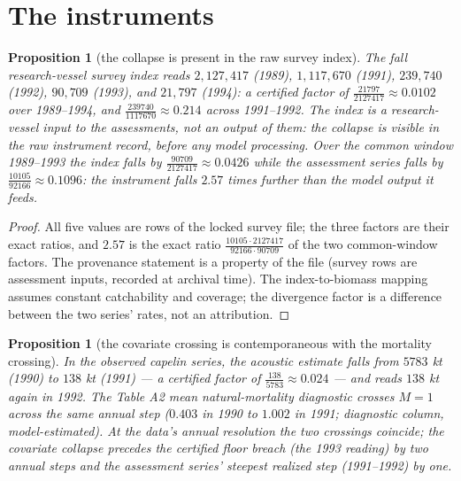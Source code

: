 \documentclass[10pt,twocolumn]{article}
\theoremstyle{plain}
\newtheorem{proposition}[theorem]{Proposition}
\theoremstyle{remark}
\begin{document}
\section{The instruments}\label{instruments}

\begin{proposition}[the collapse is present in the raw survey index]
\label{prop:survey}
The fall research-vessel survey index reads \(2{,}127{,}417\) (1989),
\(1{,}117{,}670\) (1991), \(239{,}740\) (1992), \(90{,}709\) (1993),
and \(21{,}797\) (1994): a certified factor of
\(\tfrac{21797}{2127417} \approx 0.0102\) over 1989--1994, and
\(\tfrac{239740}{1117670} \approx 0.214\) across 1991--1992. The index
is a research-vessel input to the assessments, not an output of them:
the collapse is visible in the raw instrument record, before any model
processing. Over the common window 1989--1993 the index falls by
\(\tfrac{90709}{2127417} \approx 0.0426\) while the assessment series
falls by \(\tfrac{10105}{92166} \approx 0.1096\): the instrument falls
\(2.57\) times further than the model output it feeds.
\end{proposition}

\begin{proof}
All five values are rows of the locked survey file; the three factors
are their exact ratios, and \(2.57\) is the exact ratio
\(\tfrac{10105 \cdot 2127417}{92166 \cdot 90709}\) of the two
common-window factors. The provenance statement is a property of the
file (survey rows are assessment inputs, recorded at archival time).
The index-to-biomass mapping assumes constant catchability and
coverage; the divergence factor is a difference between the two
series' rates, not an attribution.
\end{proof}

\begin{proposition}[the covariate crossing is contemporaneous with the
mortality crossing]\label{prop:capelin}
In the observed capelin series, the acoustic estimate falls from
\(5783\) kt (1990) to \(138\) kt (1991) --- a certified factor of
\(\tfrac{138}{5783} \approx 0.024\) --- and reads \(138\) kt again in
1992. The Table A2 mean natural-mortality diagnostic crosses
\(M = 1\) across the same annual step (\(0.403\) in 1990 to \(1.002\)
in 1991; diagnostic column, model-estimated). At the data's annual
resolution the two crossings coincide; the covariate collapse precedes
the certified floor breach (the 1993 reading) by two annual steps and
the assessment series' steepest realized step (1991--1992) by one.
\end{proposition}
\end{document}
